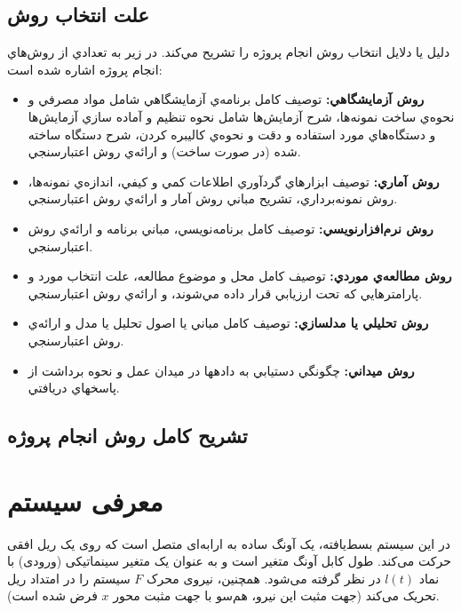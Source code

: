 \subsection{علت انتخاب روش}
دليل يا دلايل انتخاب روش انجام پروژه را تشريح مي‌کند.
در زير به تعدادي از روش‌هاي انجام پروژه اشاره شده است:
\begin{itemize}
    \item \textbf{روش آزمايشگاهي‌:} توصيف كامل برنامه‌ي آزمايشگاهي شامل مواد مصرفي و نحوه‌ي ساخت نمونه‌ها، شرح آزمايش‌ها شامل نحوه تنظيم و آماده سازي آزمايش‌ها و دستگاه‌هاي مورد استفاده و دقت و نحوه‌ي كاليبره كردن، شرح دستگاه ساخته شده (در صورت ساخت) و ارائه‌ي روش اعتبارسنجي.
    \item \textbf{روش آماري:} توصيف ابزارهاي گردآوري اطلاعات كمي و كيفي، اندازه‌ي نمونه‌ها، روش نمونه‌برداري، تشريح مباني روش آمار و ارائه‌ي روش اعتبارسنجي.
    \item \textbf{روش نرم‌افزارنويسي:} توصيف كامل برنامه‌نويسي، مباني برنامه و ارائه‌ي روش اعتبارسنجي.
    \item \textbf{روش مطالعه‌ي موردي:} توصيف كامل محل و موضوع مطالعه، علت انتخاب مورد و پارامترهايي كه تحت ارزيابي قرار داده مي‌شوند، و ارائه‌ي روش اعتبارسنجي.
    \item \textbf{روش تحليلي يا مدلسازي:} توصيف كامل مباني يا اصول تحليل يا مدل و ارائه‌ي روش اعتبارسنجي.
    \item \textbf{روش ميداني:} چگونگي دستيابي به دادهها در ميدان عمل و نحوه برداشت از پاسخهاي دريافتي.
\end{itemize}
\subsection{تشريح كامل روش انجام پروژه}

\section{معرفی سیستم}

در این سیستم بسط‌یافته، یک آونگ ساده به ارابه‌ای متصل است که روی یک ریل افقی حرکت می‌کند. طول کابل آونگ متغیر است و به عنوان یک متغیر سینماتیکی (ورودی) با نماد $l(t)$ در نظر گرفته می‌شود. همچنین، نیروی محرک $F$ سیستم را در امتداد ریل تحریک می‌کند (جهت مثبت این نیرو، هم‌سو با جهت مثبت محور $x$ فرض شده است).


